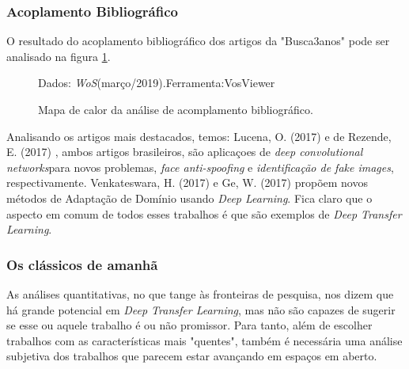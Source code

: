 \documentclass[sigconf]{acmart}
\newcommand{\source}[2]{\raggedleft{}\vspace*{-7mm}\caption*{ \textmd{\scriptsize{Dados: {#1}.\hfill Ferramenta:{#2}}}}}
\begin{document}
  \subsubsection{Acoplamento Bibliográfico}
  O resultado do acoplamento bibliográfico dos artigos da "Busca3anos" pode ser analisado na figura \ref{fig:bicoupling}.
  \begin{figure}[b]
    \source{\emph{WoS}(março/2019)}{VosViewer}
    \caption{Mapa de calor da análise de acomplamento bibliográfico.} \label{fig:bicoupling}
  \end{figure}

  Analisando os artigos mais destacados, temos:
  Lucena, O. (2017) \cite{Lucena2017} e de Rezende, E. (2017) \cite{Rezende2017}, ambos artigos brasileiros, são aplicaçoes de \emph{deep convolutional networks}para novos problemas, \emph{face anti-spoofing} e \emph{identificação de fake images}, respectivamente.
  Venkateswara, H. (2017) \cite{Venkateswara2017} e Ge, W. (2017)\cite{Ge2017} propõem novos métodos de Adaptação de Domínio usando \emph{Deep Learning}. 
  Fica claro que o aspecto em comum de todos esses trabalhos é que são exemplos de \emph{Deep Transfer Learning}.

  \subsubsection{Os clássicos de amanhã}
  As análises quantitativas, no que tange às fronteiras de pesquisa, nos dizem que há grande potencial em \emph{Deep Transfer Learning}, mas não são capazes de sugerir se esse ou aquele trabalho é ou não promissor.  Para tanto, além de escolher trabalhos com as características mais "quentes", também é necessária uma análise subjetiva dos trabalhos que parecem estar avançando em espaços em aberto. 
  
\end{document}
